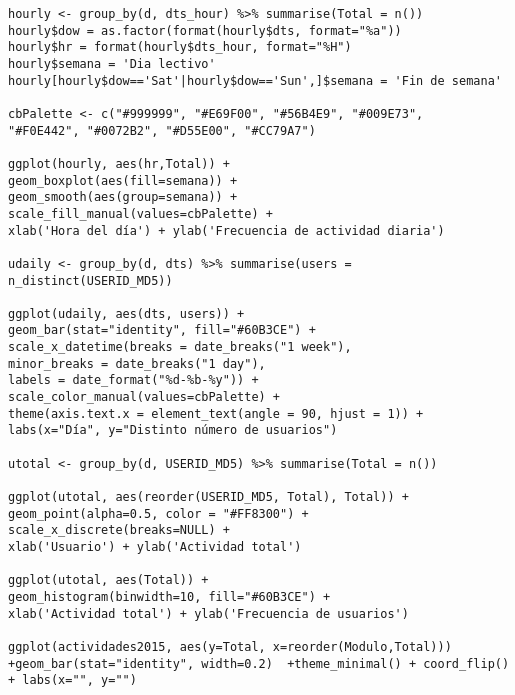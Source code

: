 \begin{lstlisting}
hourly <- group_by(d, dts_hour) %>% summarise(Total = n())
hourly$dow = as.factor(format(hourly$dts, format="%a"))
hourly$hr = format(hourly$dts_hour, format="%H")
hourly$semana = 'Dia lectivo'
hourly[hourly$dow=='Sat'|hourly$dow=='Sun',]$semana = 'Fin de semana'

cbPalette <- c("#999999", "#E69F00", "#56B4E9", "#009E73",
"#F0E442", "#0072B2", "#D55E00", "#CC79A7")

ggplot(hourly, aes(hr,Total)) +
geom_boxplot(aes(fill=semana)) +
geom_smooth(aes(group=semana)) +
scale_fill_manual(values=cbPalette) +
xlab('Hora del día') + ylab('Frecuencia de actividad diaria')

udaily <- group_by(d, dts) %>% summarise(users = n_distinct(USERID_MD5))

ggplot(udaily, aes(dts, users)) +
geom_bar(stat="identity", fill="#60B3CE") +
scale_x_datetime(breaks = date_breaks("1 week"),
minor_breaks = date_breaks("1 day"),
labels = date_format("%d-%b-%y")) +
scale_color_manual(values=cbPalette) +
theme(axis.text.x = element_text(angle = 90, hjust = 1)) +
labs(x="Día", y="Distinto número de usuarios")

utotal <- group_by(d, USERID_MD5) %>% summarise(Total = n())

ggplot(utotal, aes(reorder(USERID_MD5, Total), Total)) +
geom_point(alpha=0.5, color = "#FF8300") +
scale_x_discrete(breaks=NULL) +
xlab('Usuario') + ylab('Actividad total')

ggplot(utotal, aes(Total)) +
geom_histogram(binwidth=10, fill="#60B3CE") +
xlab('Actividad total') + ylab('Frecuencia de usuarios')

ggplot(actividades2015, aes(y=Total, x=reorder(Modulo,Total))) +geom_bar(stat="identity", width=0.2)  +theme_minimal() + coord_flip() + labs(x="", y="")

\end{lstlisting}	
	
